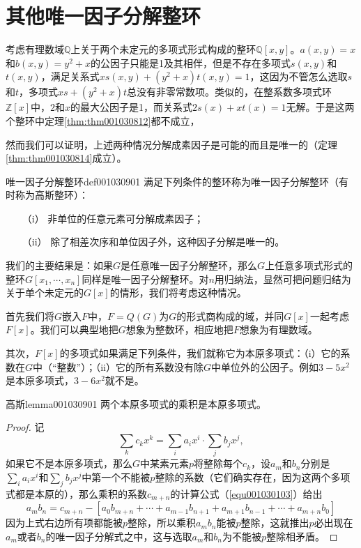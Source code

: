 \section{其他唯一因子分解整环}\label{subsection0010309}
考虑有理数域$\mathbb{Q}$上关于两个未定元的多项式形式构成的整环$\mathbb{Q}[x, y]$。$a(x,y) = x$和$b(x,y)=y^2+x$的公因子只能是1及其相伴，但是不存在多项式$s(x,y)$和$t(x,y)$，满足关系式$xs(x,y)+(y^2+x)t(x,y)=1$，这因为不管怎么选取$s$和$t$，多项式$xs+(y^2+x)t$总没有非零常数项。类似的，在整系数多项式环$\mathbb{Z}[x]$中，$2$和$x$的最大公因子是1，而关系式$2s(x)+xt(x)=1$无解。于是这两个整环中定理\ref{thm:thm001030812}都不成立，

然而我们可以证明，上述两种情况分解成素因子是可能的而且是唯一的（定理\ref{thm:thm001030814}成立）。
\begin{definition}{唯一因子分解整环}{def001030901}
满足下列条件的整环称为唯一因子分解整环（有时称为高斯整环）：
\begin{enumerate}
\item[（i）] 非单位的任意元素可分解成素因子；
\item[（ii）] 除了相差次序和单位因子外，这种因子分解是唯一的。
\end{enumerate}
\end{definition}

我们的主要结果是：如果$G$是任意唯一因子分解整环，那么$G$上任意多项式形式的整环$G[x_1, \cdots, x_n]$同样是唯一因子分解整环。对$n$用归纳法，显然可把问题归结为关于单个未定元的$G[x]$的情形，我们将考虑这种情况。

首先我们将$G$嵌入$F$中，$F=Q(G)$为$G$的形式商构成的域，并同$G[x]$一起考虑$F[x]$。我们可以典型地把$G$想象为整数环，相应地把$F$想象为有理数域。

其次，$F[x]$的多项式如果满足下列条件，我们就称它为本原多项式：（i）它的系数在$G$中（“整数”）；（ii）它的所有系数没有除$G$中单位外的公因子。例如$3-5x^2$是本原多项式，$3-6x^2$就不是。

\begin{lemma}{高斯}{lemma001030901}
两个本原多项式的乘积是本原多项式。
\end{lemma}

\begin{proof}
记
\[
\sum_{k}{c_kx^k} = \sum_{i}{a_ix^i} \cdot \sum_{j}{b_jx^j},
\]
如果它不是本原多项式，那么$G$中某素元素$p$将整除每个$c_k$，设$a_m$和$b_n$分别是$\sum_{i}{a_ix^i}$和$\sum_{j}{b_jx^j}$中第一个不能被$p$整除的系数（它们确实存在，因为这两个多项式都是本原的），那么乘积的系数$c_{m+n}$的计算公式（\ref{equ001030103}）给出
\[
a_mb_n=c_{m+n} - [a_0b_{m+n} + \cdots+a_{m-1}b_{n+1} + a_{m+1}b_{n-1} + \cdots+a_{m+n}b_0]
\]
因为上式右边所有项都能被$p$整除，所以乘积$a_mb_n$能被$p$整除，这就推出$p$必出现在$a_m$或者$b_n$的唯一因子分解式之中，这与选取$a_m$和$b_n$为不能被$p$整除相矛盾。
\end{proof}

